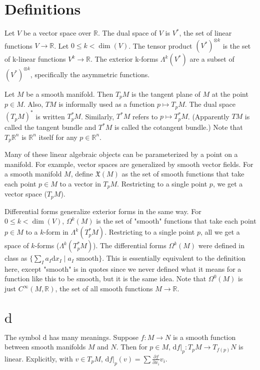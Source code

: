 \documentclass[10pt]{article}
\newcommand{\gap}{\vspace{3mm}}
\newcommand{\bb}[1]{\mathbb{#1}}
\newcommand{\de}{\mathrm{d}}
\newcommand{\frakx}{\mathfrak{X}}
\newcommand{\partials}[2]{\frac{\partial #1}{\partial #2}}
\begin{document}
	\section*{Definitions}

	Let $V$ be a vector space over $\bb{R}$. The dual space of $V$ is $V^*$, the set of linear functions $V \to \bb{R}$. Let $0 \leq k < \dim(V)$. The tensor product $(V^*)^{\otimes k}$ is the set of k-linear functions $V^k \to \bb{R}$. The exterior k-forms $\Lambda^k(V^*)$ are a subset of $(V^*)^{\otimes k}$, specifically the asymmetric functions.

	\gap
	Let $M$ be a smooth manifold. Then $T_p M$ is the tangent plane of $M$ at the point $p \in M$. Also, $TM$ is informally used as a function $p \mapsto T_p M$. The dual space $(T_p M)^*$ is written $T_p^* M$. Similarly, $T^* M$ refers to $p \mapsto T_p^* M$. (Apparently $TM$ is called the tangent bundle and $T^* M$ is called the cotangent bundle.) Note that $T_p \bb{R}^n$ is $\bb{R}^n$ itself for any $p \in \bb{R}^n$.

	\gap
	Many of these linear algebraic objects can be parameterized by a point on a manifold. For example, vector spaces are generalized by smooth vector fields. For a smooth manifold $M$, define $\frakx(M)$ as the set of smooth functions that take each point $p \in M$ to a vector in $T_p M$. Restricting to a single point $p$, we get a vector space ($T_p M$).

	Differential forms generalize exterior forms in the same way. For $0 \leq k < \dim(V)$, $\Omega^k(M)$ is the set of "smooth" functions that take each point $p \in M$ to a $k$-form in $\Lambda^k(T_p^* M)$. Restricting to a single point $p$, all we get a space of $k$-forms ($\Lambda^k(T_p^* M)$). The differential forms $\Omega^k(M)$ were defined in class as $\{\sum_I a_I \de x_I \mid a_I \text{ smooth}\}$. This is essentially equivalent to the definition here, except "smooth" is in quotes since we never defined what it means for a function like this to be smooth, but it is the same idea. Note that $\Omega^0(M)$ is just $C^\infty(M, \bb{R})$, the set of all smooth functions $M \to \bb{R}$.

	\section*{$\de$}
	The symbol $\de$ has many meanings. Suppose $f : M \to N$ is a smooth function between smooth manifolds $M$ and $N$. Then for $p \in M$, $\de f|_p : T_p M \to T_{f(p)} N$ is linear. Explicitly, with $v \in T_p M$, $\de f|_p(v) = \sum \partials{f}{x_i} v_i$. %
\end{document}
